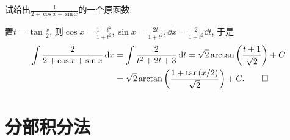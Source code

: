 \begin{quizb}
\woe 试给出\(\frac{1}{2+\cos x+\sin x}\)的一个原函数.
\begin{solution}
置\(t=\tan\frac{x}{2}\), 则\(\cos x=\frac{1-t^2}{1+t^2},\sin x=\frac{2t}{1+t^2},\dd x=\frac{2}{1+t^2}\dd t\), 于是\[\begin{split}
\int\frac{2}{2+\cos x+\sin x}\,\mathrm{d} x&=\int \frac{2}{t^2+2t+3}\,\mathrm{d} t=\sqrt{2}\arctan\left(\frac{t+1}{\sqrt{2}}\right)+C\\
&=\sqrt{2}\arctan\left(\frac{1+\tan(x/2)}{\sqrt{2}}\right)+C.\qedhere
\end{split}\]
\end{solution}
\end{quizb}
\section{分部积分法}
